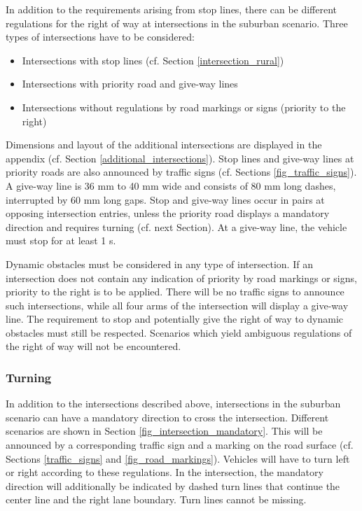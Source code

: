 In addition to the requirements arising from stop lines, there can be different
regulations for the right of way at intersections in the suburban scenario.
Three types of intersections have to be considered:

\begin{itemize}
	\item Intersections with stop lines (cf. Section \ref{intersection_rural})
	\item Intersections with priority road and give-way lines
	\item Intersections without regulations by road markings or signs (priority to the
	      right)
\end{itemize}

Dimensions and layout of the additional intersections are displayed in the
appendix (cf. Section \ref{additional_intersections}). Stop lines and give-way
lines at priority roads are also announced by traffic signs (cf. Sections
\ref{fig_traffic_signs}). A give-way line is 36 mm to 40 mm wide and consists
of 80 mm long dashes, interrupted by 60 mm long gaps. Stop and give-way lines
occur in pairs at opposing intersection entries, unless the priority road
displays a mandatory direction and requires turning (cf. next Section). At a
give-way line, the vehicle must stop for at least 1 s.

Dynamic obstacles must be considered in any type of intersection. If an
intersection does not contain any indication of priority by road markings or
signs, priority to the right is to be applied. There will be no traffic signs
to announce such intersections, while all four arms of the intersection will
display a give-way line. The requirement to stop and potentially give the right
of way to dynamic obstacles must still be respected. Scenarios which yield
ambiguous regulations of the right of way will not be encountered.

\subsubsection{Turning}
\label{turning}

In addition to the intersections described above, intersections in the suburban
scenario can have a mandatory direction to cross the intersection. Different
scenarios are shown in Section \ref{fig_intersection_mandatory}. This will be
announced by a corresponding traffic sign and a marking on the road surface
(cf. Sections \ref{traffic_signs} and \ref{fig_road_markings}). Vehicles will
have to turn left or right according to these regulations. In the intersection,
the mandatory direction will additionally be indicated by dashed turn lines
that continue the center line and the right lane boundary. Turn lines cannot be
missing.

